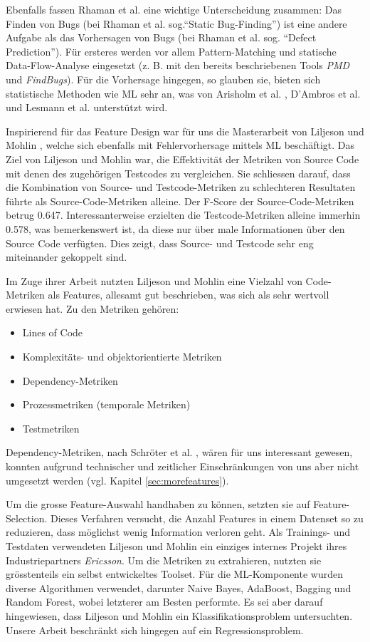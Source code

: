 \documentclass[10pt, a4paper]{article}
\begin{document}
Ebenfalls fassen Rhaman et al. eine wichtige Unterscheidung zusammen: Das Finden von Bugs (bei Rhaman et al. sog.``Static Bug-Finding'') ist eine andere Aufgabe als das Vorhersagen von Bugs (bei Rhaman et al. sog. ``Defect Prediction''). Für ersteres werden vor allem Pattern-Matching und statische Data-Flow-Analyse eingesetzt (z. B. mit den bereits beschriebenen Tools \emph{PMD} und \emph{FindBugs}). Für die Vorhersage hingegen, so glauben sie, bieten sich statistische Methoden wie \ac{ML} sehr an, was von Arisholm et al. \cite{Arisholm2010}, D'Ambros et al. \cite{DAmbros2011} und Lesmann et al. \cite{Lessmann2008} unterstützt wird.

Inspirierend für das Feature Design war für uns die Masterarbeit von Liljeson und Mohlin \cite{Liljeson831487}, welche sich ebenfalls mit Fehlervorhersage mittels \ac{ML} beschäftigt. Das Ziel von Liljeson und Mohlin war, die Effektivität der Metriken von Source Code mit denen des zugehörigen Testcodes zu vergleichen. Sie schliessen darauf, dass die Kombination von Source- und Testcode-Metriken zu schlechteren Resultaten führte als Source-Code-Metriken alleine. Der F-Score der Source-Code-Metriken betrug 0.647. Interessanterweise erzielten die Test\-co\-de-Me\-trik\-en alleine immerhin 0.578, was bemerkenswert ist, da diese nur über male Informationen über den Source Code verfügten. Dies zeigt, dass Source- und Testcode sehr eng miteinander gekoppelt sind.

Im Zuge ihrer Arbeit nutzten Liljeson und Mohlin eine Vielzahl von Code-Metriken als Features, allesamt gut beschrieben, was sich als sehr wertvoll erwiesen hat. Zu den Metriken gehören:
\begin{itemize}
	\item Lines of Code
	\item Komplexitäts- und objektorientierte Metriken
	\item Dependency-Metriken
	\item Prozessmetriken (temporale Metriken)
	\item Testmetriken
\end{itemize}
Dependency-Metriken, nach Schröter et al. \cite{Schroter:2006:PCF:1159733.1159739}, wären für uns interessant gewesen, konnten aufgrund technischer und zeitlicher Einschränkungen von uns aber nicht umgesetzt werden (vgl. Kapitel \ref{sec:morefeatures}).

Um die grosse Feature-Auswahl handhaben zu können, setzten sie auf Fe\-atu\-re-Se\-lec\-tion. Dieses Verfahren versucht, die Anzahl Features in einem Datenset so zu reduzieren, dass möglichst wenig Information verloren geht. Als Trainings- und Testdaten verwendeten Liljeson und Mohlin ein einziges internes Projekt ihres Industriepartners \emph{Ericsson}. Um die Metriken zu extrahieren, nutzten sie grösstenteils ein selbst entwickeltes Toolset. Für die \ac{ML}-Komponente wurden diverse Algorithmen verwendet, darunter Naive Bayes, AdaBoost, Bagging und Random Forest, wobei letzterer am Besten performte. Es sei aber darauf hingewiesen, dass Liljeson und Mohlin ein Klassifikationsproblem untersuchten. Unsere Arbeit beschränkt sich hingegen auf ein Regressionsproblem.
\end{document}
